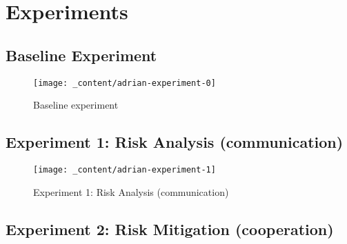 \section{Experiments}
\label{sec:experiments}


\subsection{Baseline Experiment}

\begin{figure}[H]
    \centering
    \texttt{[image: \_content/adrian-experiment-0]}
    \caption{Baseline experiment}
    \label{fig:baseline}
\end{figure}

\subsection{Experiment 1: Risk Analysis (communication)}
\begin{figure}[H]
    \centering
    \texttt{[image: \_content/adrian-experiment-1]}
    \caption{Experiment 1: Risk Analysis (communication)}
    \label{fig:experiment-1}
\end{figure}

\subsection{Experiment 2: Risk Mitigation (cooperation)}
